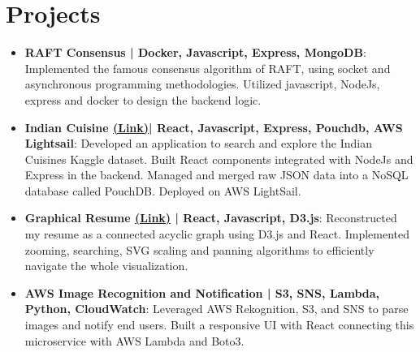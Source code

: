 \documentclass[a4paper,30pt]{article}
\newcommand{\resumeItem}[2]{
  \item\normalsize{
    \textbf{#1}{: #2 \vspace{-2pt}}
  }
}
\newcommand{\resumeSubItem}[2]{\resumeItem{#1}{#2}\vspace{-3pt}}
\newcommand{\resumeSubHeadingListStart}{\begin{itemize}[leftmargin=*]}
\newcommand{\resumeSubHeadingListEnd}{\end{itemize}}
\begin{document}
\section{Projects}
\resumeSubHeadingListStart
\vspace{2pt}
\resumeSubItem{RAFT Consensus | Docker, Javascript, Express, MongoDB}{Implemented the famous consensus algorithm of RAFT, using socket and asynchronous programming
methodologies. Utilized javascript, NodeJs, express and docker to design the backend logic. }
\vspace{2pt}
\resumeSubItem{Indian Cuisine  \href{http://indiancuisineskaggle.com/}{(Link)}| React, Javascript, Express, Pouchdb, AWS Lightsail}{Developed an application to search and explore the Indian Cuisines Kaggle dataset. Built React components
integrated with NodeJs and Express in the backend. Managed and merged raw JSON data into a NoSQL database called PouchDB. Deployed on AWS LightSail.}
\vspace{2pt}
\resumeSubItem{Graphical Resume  \href{https://omegaji.github.io/Graphical-Resume/}{(Link)} | React, Javascript, D3.js}{Reconstructed my resume as a connected acyclic graph using D3.js and React. Implemented zooming, searching, SVG scaling and panning algorithms to efficiently navigate the whole visualization.  }
\vspace{2pt}
\resumeSubItem{AWS Image Recognition and Notification | S3, SNS, Lambda, Python, CloudWatch}{Leveraged AWS Rekognition, S3, and SNS to parse images and notify end users. Built a responsive UI with React connecting this microservice with AWS Lambda and Boto3.
}
\resumeSubHeadingListEnd
\end{document}
